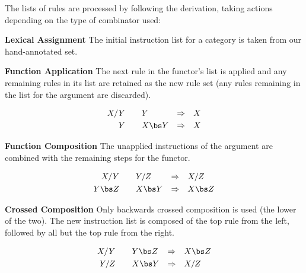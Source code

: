 The lists of rules are processed by following the \ccg derivation, taking actions depending on the type of combinator used:

\vspace{5mm}
\noindent
\textbf{Lexical Assignment} The initial instruction list for a category is taken from our hand-annotated set.

\vspace{3mm}
\noindent
\begin{minipage}[c]{0.6\textwidth}
\textbf{Function Application} The next rule in the functor's list is applied and any remaining rules in its list are retained as the new rule set (any rules remaining in the list for the argument are discarded).
\end{minipage}\hfill
\begin{minipage}[c]{0.3\textwidth}
\zerodisplayskips
\begin{align*}
  \cf{X / Y} \quad & \quad \cf{Y}       & \Rightarrow & \quad \cf{X} \\
  \cf{Y}     \quad & \quad \cf{X \bs Y} & \Rightarrow & \quad \cf{X}
\end{align*}
\end{minipage}

\vspace{3mm}
\noindent
\begin{minipage}[c]{0.6\textwidth}
\textbf{Function Composition} The unapplied instructions of the argument are combined with the remaining steps for the functor.
\end{minipage}\hfill
\begin{minipage}[c]{0.3\textwidth}
\zerodisplayskips
\begin{align*}
  \cf{X / Y} \quad   & \quad \cf{Y / Z}   & \Rightarrow & \quad \cf{X / Z} \\
  \cf{Y \bs Z} \quad & \quad \cf{X \bs Y} & \Rightarrow & \quad \cf{X \bs Z}
\end{align*}
\end{minipage}

\vspace{3mm}
\noindent
\begin{minipage}[c]{0.6\textwidth}
\textbf{Crossed Composition}
Only backwards crossed composition is used (the lower of the two).
The new instruction list is composed of the top rule from the left, followed by all but the top rule from the right.
\end{minipage}\hfill
\begin{minipage}[c]{0.3\textwidth}
\zerodisplayskips
\begin{align*}
  \cf{X / Y} \quad & \quad \cf{Y \bs Z} & \Rightarrow & \quad \cf{X \bs Z} \\
  \cf{Y / Z} \quad & \quad \cf{X \bs Y} & \Rightarrow & \quad \cf{X / Z}
\end{align*}
\end{minipage}

